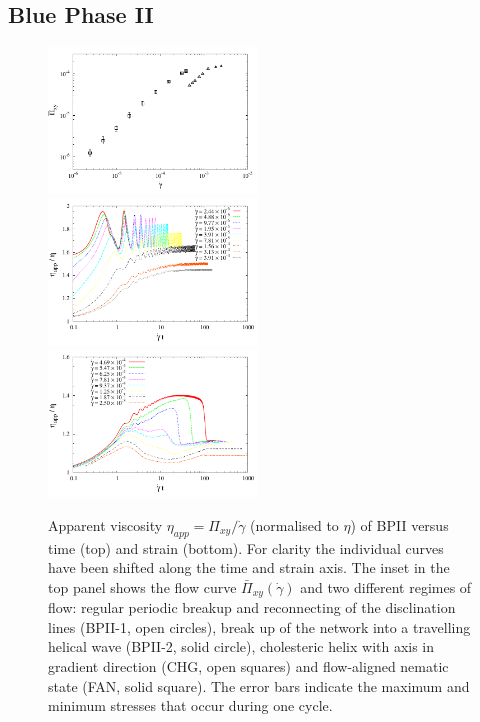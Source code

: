 \documentclass[8.5pt,twoside,twocolumn]{article}
\newcommand{\gd}{\dot{\gamma}}
\begin{document}
\subsection{Blue Phase II}

\begin{figure}[htpb]
\includegraphics[width=0.495\textwidth]{flowcurve_bp2.pdf}\\
\includegraphics[width=0.495\textwidth]{app_visc_strain_bp2_a.pdf}\\
\includegraphics[width=0.495\textwidth]{app_visc_strain_bp2_b.pdf}\\
\caption{Apparent viscosity $\eta_{app}=\Pi_{xy}/\gd$ (normalised to $\eta$) 
of BPII versus time (top) and strain (bottom). 
For clarity the individual curves have been shifted along the time and strain axis. 
The inset in the top panel 
shows the flow curve $\bar{\Pi}_{xy}(\gd)$ and two different regimes of flow: 
regular periodic breakup and reconnecting of the disclination lines (BPII-1, open circles), 
break up of the network into a travelling helical wave (BPII-2, solid circle), 
cholesteric helix with axis in gradient direction (CHG, open squares)
and flow-aligned nematic state (FAN, solid square).
The error bars indicate the maximum and minimum stresses that occur during one cycle.}
\label{bp2-rheo}
\end{figure}
\end{document}
